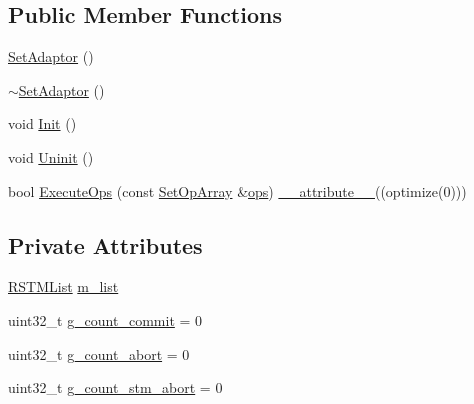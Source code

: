 \subsection*{Public Member Functions}
\begin{DoxyCompactItemize}
\item 
\hyperlink{classSetAdaptor_3_01RSTMList_01_4_a11fa9978bccf2839600bd28734f647af}{Set\-Adaptor} ()
\item 
\hyperlink{classSetAdaptor_3_01RSTMList_01_4_ab8228acd306a1abe9cbe76a9ffb3559b}{$\sim$\-Set\-Adaptor} ()
\item 
void \hyperlink{classSetAdaptor_3_01RSTMList_01_4_ad85354a2aeb3b26ab57457ad8c9c3a41}{Init} ()
\item 
void \hyperlink{classSetAdaptor_3_01RSTMList_01_4_afd4d0e956e45032c550971dd375a0df0}{Uninit} ()
\item 
bool \hyperlink{classSetAdaptor_3_01RSTMList_01_4_a1594df7ff733c17f89d4c2175269bdc7}{Execute\-Ops} (const \hyperlink{setadaptor_8h_a7af6ba4d94b446744e0e49accfb08e24}{Set\-Op\-Array} \&\hyperlink{stmskip_8cc_a91ee67dbc899b78fabcd2bfc4643d307}{ops}) \hyperlink{counted__ptr_8hpp_a454a5e4bfc1243a175baaa7327bb751f}{\-\_\-\-\_\-attribute\-\_\-\-\_\-}((optimize(0)))
\end{DoxyCompactItemize}
\subsection*{Private Attributes}
\begin{DoxyCompactItemize}
\item 
\hyperlink{classRSTMList}{R\-S\-T\-M\-List} \hyperlink{classSetAdaptor_3_01RSTMList_01_4_a826afd01fb3a7f2166cf7e6789f99cbf}{m\-\_\-list}
\item 
uint32\-\_\-t \hyperlink{classSetAdaptor_3_01RSTMList_01_4_af3874e2d596d426ef16d8d1b61ecd994}{g\-\_\-count\-\_\-commit} = 0
\item 
uint32\-\_\-t \hyperlink{classSetAdaptor_3_01RSTMList_01_4_a55375f9e3913416ccba84958682fc630}{g\-\_\-count\-\_\-abort} = 0
\item 
uint32\-\_\-t \hyperlink{classSetAdaptor_3_01RSTMList_01_4_a6df7f5de51e538c2fe8f19d6ef9ce7cd}{g\-\_\-count\-\_\-stm\-\_\-abort} = 0
\end{DoxyCompactItemize}


